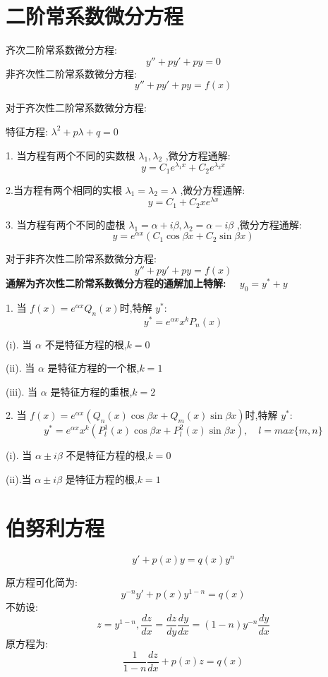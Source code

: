 \section{二阶常系数微分方程}
\begin{definition}[二阶常系数微分方程]
	齐次二阶常系数微分方程:
	$$y''+py'+py=0$$
	非齐次性二阶常系数微分方程:
	$$y''+py'+py=f(x)$$
\end{definition}
\begin{theorem}\label{the: 二阶常系数微分方程}
	对于齐次性二阶常系数微分方程:

	特征方程:  $\lambda^{2}+p\lambda+q=0$

	1. 当方程有两个不同的实数根 $\lambda_{1},\lambda_{2}$ ,微分方程通解: $$y=C_{1}e^{\lambda_{1} x}+C_{2}e^{\lambda_{2}x}$$

	2.当方程有两个相同的实根 $\lambda_{1}=\lambda_{2}=\lambda$ ,微分方程通解: $$y=C_{1}+C_{2}xe^{\lambda x}$$

	3. 当方程有两个不同的虚根 $\lambda_{1}=\alpha +i\beta,\lambda_{2}=\alpha-i\beta$ ,微分方程通解: $$y=e^{\alpha x}(C_{1}\cos \beta x+C_{2}\sin \beta x)$$
\end{theorem}
\begin{theorem}[二阶常系数微分方程解]
	对于非齐次性二阶常系数微分方程:
	$$y''+py'+py=f(x)$$
	\textbf{通解为齐次性二阶常系数微分方程的通解加上特解: $\quad y_{0}=y^{*}+y$}

	1. 当 $f(x)=e^{\alpha x}Q_{n}(x)$时,特解 $y^{*}$:
	$$y^{*}=e^{\alpha x}x^{k}P_{n}(x)$$

	(i). 当 $\alpha$ 不是特征方程的根,$k=0$

	(ii). 当 $\alpha$ 是特征方程的一个根,$k=1$

	(iii). 当 $\alpha$ 是特征方程的重根,$k=2$

	2. 当 $f(x)=e^{\alpha x}(Q_{n}(x)\cos \beta x+Q_{m}(x)\sin \beta x)$时,特解 $y^{*}$:
	$$y^{*}=e^{\alpha x}x^{k}(P_{l}^{1}(x)\cos \beta x+P_{l}^{2}(x)\sin \beta x),\quad l=max\{m,n\}$$

	(i). 当 $\alpha\pm i\beta$ 不是特征方程的根,$k=0$

	(ii).当 $\alpha\pm i\beta$ 是特征方程的根,$k=1$
\end{theorem}
\section{伯努利方程}
\begin{definition}[伯努利方程]\label{def: 伯努利方程}
	$$y'+p(x)y=q(x)y^{n}$$
\end{definition}
\begin{theorem}
	原方程可化简为:
	$$y^{-n}y'+p(x)y^{1-n}=q(x)$$
	不妨设:  $$z=y^{1-n},\dfrac{dz}{dx}=\dfrac{dz}{dy}\dfrac{dy}{dx}=(1-n)y^{-n}\dfrac{dy}{dx}$$
	原方程为:
	$$\dfrac{1}{1-n}\dfrac{dz}{dx}+p(x)z=q(x)$$
\end{theorem}
